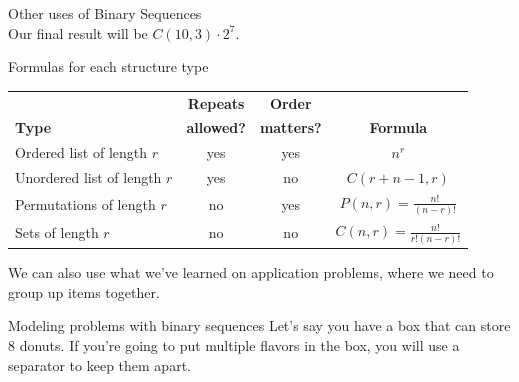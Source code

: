 {\begin{intro}{Other uses of Binary Sequences}
		~\\ Our final result will be $C(10,3) \cdot 2^{7}$.
	\end{intro}
	
    \begin{intro}{Formulas for each structure type}
	
		\begin{center}
			\begin{tabular}{l | c | c | c }
				\textbf{}
					& \textbf{Repeats}
					& \textbf{Order}
					& \textbf{}
				\\
				\textbf{Type}
					& \textbf{allowed?}
					& \textbf{matters?}
					& \textbf{Formula}
				\\ \hline
				Ordered list of length $r$
					& yes
					& yes
					& $n^{r}$

				\\ \hline
				Unordered list of length $r$
					& yes
					& no
					& $C(r + n - 1, r)$
				\\ \hline
				Permutations of length $r$
					& no
					& yes
					& $P(n,r) = \frac{n!}{(n-r)!}$
				\\ \hline
				Sets of length $r$
					& no
					& no
					& $C(n,r) = \frac{n!}{r!(n-r)!}$
			\end{tabular}
		\end{center}
        
    \end{intro}

    We can also use what we've learned on application problems, where we need to
    group up items together.

    \newpage

    \begin{intro}{Modeling problems with binary sequences}
        Let's say you have a box that can store 8 donuts.
        If you're going to put multiple flavors in the box, you will
        use a separator to keep them apart.


\end{intro}}
